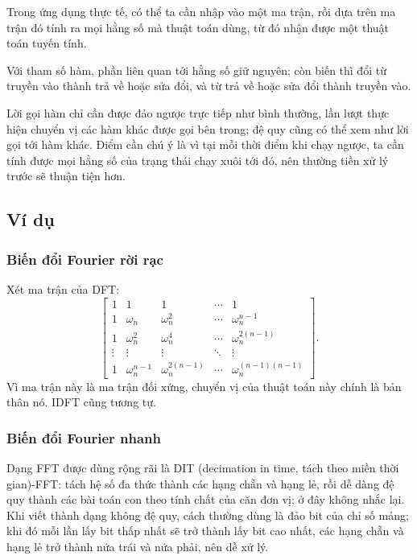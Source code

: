 \documentclass[11pt]{article}
\begin{document}
Trong ứng dụng thực tế, có thể ta cần nhập vào một ma trận, rồi dựa trên ma
trận đó tính ra mọi hằng số mà thuật toán dùng, từ đó nhận được một thuật toán
tuyến tính.

Với tham số hàm, phần liên quan tới hằng số giữ nguyên; còn biến thì đổi từ
truyền vào thành trả về hoặc sửa đổi, và từ trả về hoặc sửa đổi thành truyền
vào.

Lời gọi hàm chỉ cần được đảo ngược trực tiếp như bình thường, lần lượt thực
hiện chuyển vị các hàm khác được gọi bên trong; đệ quy cũng có thể xem như lời
gọi tới hàm khác. Điểm cần chú ý là vì tại mỗi thời điểm khi chạy ngược, ta cần
tính được mọi hằng số của trạng thái chạy xuôi tới đó, nên thường tiền xử lý
trước sẽ thuận tiện hơn.

\subsection{Ví dụ}

\subsubsection{Biến đổi Fourier rời rạc}

Xét ma trận của DFT:
\[
\begin{bmatrix}
1 & 1 & 1 & \cdots & 1\\
1 & \omega_n & \omega_n^2 & \cdots & \omega_n^{n-1}\\
1 & \omega_n^2 & \omega_n^4 & \cdots & \omega_n^{2(n-1)}\\
\vdots & \vdots & \vdots & \ddots & \vdots\\
1 & \omega_n^{n-1} & \omega_n^{2(n-1)} & \cdots &
\omega_n^{(n-1)(n-1)}
\end{bmatrix}.
\]
Vì ma trận này là ma trận đối xứng, chuyển vị của thuật toán này chính là bản
thân nó. IDFT cũng tương tự.

\subsubsection{Biến đổi Fourier nhanh}

Dạng FFT được dùng rộng rãi là DIT (decimation in time, tách theo miền thời
gian)-FFT: tách hệ số đa thức thành các hạng chẵn và hạng lẻ, rồi dễ dàng đệ
quy thành các bài toán con theo tính chất của căn đơn vị; ở đây không nhắc lại.
Khi viết thành dạng không đệ quy, cách thường dùng là đảo bit của chỉ số mảng;
khi đó mỗi lần lấy bit thấp nhất sẽ trở thành lấy bit cao nhất, các hạng chẵn
và hạng lẻ trở thành nửa trái và nửa phải, nên dễ xử lý.
\end{document}
